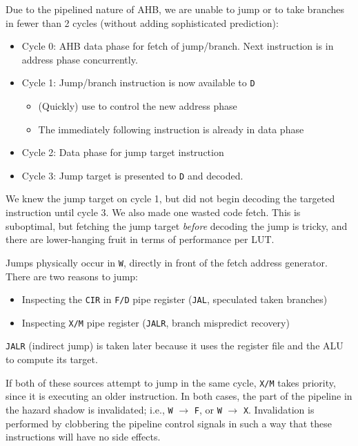 \documentclass[notitlepage]{article}
\begin{document}
Due to the pipelined nature of AHB, we are unable to jump or to take branches in fewer than 2 cycles (without adding sophisticated prediction):

\begin{itemize}
\item Cycle 0: AHB data phase for fetch of jump/branch. Next instruction is in address phase concurrently.
\item Cycle 1: Jump/branch instruction is now available to \texttt{D}
	\begin{itemize}
		\item (Quickly) use to control the new address phase
		\item The immediately following instruction is already in data phase
	\end{itemize}
\item Cycle 2: Data phase for jump target instruction
\item Cycle 3: Jump target is presented to \texttt{D} and decoded.
\end{itemize}


We knew the jump target on cycle 1, but did not begin decoding the targeted instruction until cycle 3. We also made one wasted code fetch. This is suboptimal, but fetching the jump target \textit{before} decoding the jump is tricky, and there are lower-hanging fruit in terms of performance per LUT.

Jumps physically occur in \texttt{W}, directly in front of the fetch address generator. There are two reasons to jump:

\begin{itemize}
	\item Inspecting the \texttt{CIR} in \texttt{F/D} pipe register (\texttt{JAL}, speculated taken branches)
	\item Inspecting \texttt{X/M} pipe register (\texttt{JALR}, branch mispredict recovery)
\end{itemize}

\texttt{JALR} (indirect jump) is taken later because it uses the register file and the ALU to compute its target.

If both of these sources attempt to jump in the same cycle, \texttt{X/M} takes priority, since it is executing an older instruction. In both cases, the part of the pipeline in the hazard shadow is invalidated; i.e., \texttt{W} $\to$ \texttt{F}, or \texttt{W} $\to$ \texttt{X}. Invalidation is performed by clobbering the pipeline control signals in such a way that these instructions will have no side effects.
\end{document}
